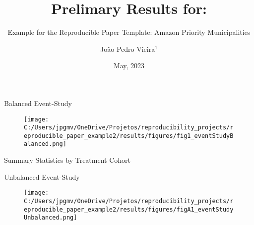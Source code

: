 \documentclass[
  ignorenonframetext,
  aspectratio=169]{beamer}
\title{Prelimary Results for:}
\subtitle{Example for the Reproducible Paper Template: Amazon Priority
Municipalities}
\author{João Pedro Vieira\(^1\)}
\date{May, 2023}
\institute{\(^1\)PUC-Rio}
\begin{document}
\frame{\titlepage}

\begin{frame}{Balanced Event-Study}
\protect\hypertarget{balanced-event-study}{}
\begin{figure}
  \texttt{[image: C:/Users/jpgmv/OneDrive/Projetos/reproducibility\_projects/reproducible\_paper\_example2/results/figures/fig1\_eventStudyBalanced.png]}
\label{fig:eventStudyBalanced}
\end{figure}
\end{frame}

\begin{frame}{Summary Statistics by Treatment Cohort}
\protect\hypertarget{summary-statistics-by-treatment-cohort}{}
\vspace{-0.5cm}

\begin{table}[H]
\centering
\scalebox{0.6}{
    
}
\label{tab:summaryStat}
\end{table}
\end{frame}

\begin{frame}{Unbalanced Event-Study}
\protect\hypertarget{unbalanced-event-study}{}
\begin{figure}
  \texttt{[image: C:/Users/jpgmv/OneDrive/Projetos/reproducibility\_projects/reproducible\_paper\_example2/results/figures/figA1\_eventStudyUnbalanced.png]}
\label{fig:eventStudyUnbalanced}
\end{figure}
\end{frame}
\end{document}
